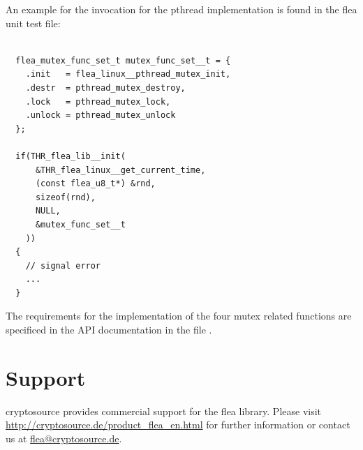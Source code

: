 \documentclass[a4paper,11pt]{scrartcl}
\begin{document}
An example for the invocation \funcLibInit for the pthread implementation is
found in the flea unit test file:
\begin{lstlisting}

  flea_mutex_func_set_t mutex_func_set__t = {
    .init   = flea_linux__pthread_mutex_init,
    .destr  = pthread_mutex_destroy,
    .lock   = pthread_mutex_lock,
    .unlock = pthread_mutex_unlock
  };

  if(THR_flea_lib__init(
      &THR_flea_linux__get_current_time,
      (const flea_u8_t*) &rnd,
      sizeof(rnd),
      NULL,
      &mutex_func_set__t
    ))
  {
    // signal error
    ...
  }
  \end{lstlisting}

  The requirements for the implementation of the four mutex related functions
  are specificed in the API documentation in the file .


  
  \section{Support}
cryptosource provides commercial support for the flea library. Please visit
\url{http://cryptosource.de/product_flea_en.html} for further information or
contact us at \url{flea@cryptosource.de}.
\end{document}
